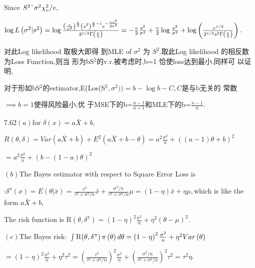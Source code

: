 \documentclass{article}
\begin{document}
Since $S^{2}\symbol{126}\sigma ^{2}\chi _{v}^{2}/v,$

$\log L\left( \sigma ^{2}|s^{2}\right) =\log \frac{\left( \frac{v}{\sigma
^{2}}\right) ^{\frac{v}{2}}\left( s^{2}\right) ^{\frac{v}{2}-1}e^{-\frac{%
vs^{2}}{2\sigma ^{2}}}}{2^{v/2}\Gamma \left( \frac{v}{2}\right) }=-\frac{v}{2%
}\frac{s^{2}}{\sigma ^{2}}+\frac{v}{2}\log \frac{s^{2}}{\sigma ^{2}}+\log
\left( \frac{v^{v/2}}{2^{v/2}s^{2}\Gamma \left( \frac{v}{2}\right) }\right)
. $

对此Log likelihood 取极大即得%
到MLE of $\sigma ^{2}$ 为 $S^{2}.$取此Log likelihood%
的相反数为Loss Function,则当%
形为bS$^{2}$的v.r.被考虑时,b=1%
恰使loss达到最小.同样可%
以证明,

对于形如bS$^{2}$的estimator,E(Los(S$%
^{2},\sigma ^{2}))=b-\log b-C,C$是与b无关的%
常数

$\implies b=1$使得风险最小,优%
于MSE下的b=$\frac{n-1}{n+1}$和MLE下的b=$%
\frac{n-1}{n}.$

7.62$\left( a\right) $for $\delta \left( x\right) =a\bar{X}+b,$

$R\left( \theta ,\delta \right) =Var\left( a\bar{X}+b\right) +E^{2}\left( a%
\bar{X}+b-\theta \right) =a^{2}\frac{\sigma ^{2}}{n}+\left( \left(
a-1\right) \theta +b\right) ^{2}$

$=a^{2}\frac{\sigma ^{2}}{n}+\left( b-\left( 1-a\right) \theta \right) ^{2}$

$\left( b\right) $The Bayes estimator with respect to Square Error Loss is

:$\delta ^{\pi }\left( x\right) =E\left( \theta |\bar{x}\right) =\frac{\tau
^{2}}{\tau ^{2}+\sigma ^{2}/n}\bar{x}+\frac{\sigma ^{2}/n}{\tau ^{2}+\sigma
^{2}/n}\mu =\left( 1-\eta \right) \bar{x}+\eta \mu ,$which is like the form $%
a\bar{X}+b,$

The risk function is R$\left( \theta ,\delta ^{\pi }\right) =\left( 1-\eta
\right) ^{2}\frac{\sigma ^{2}}{n}+\eta ^{2}\left( \theta -\mu \right) ^{2}.$

$\left( c\right) $The Bayes risk: $\int $R$\left( \theta ,\delta ^{\pi
}\right) \pi \left( \theta \right) d\theta =\left( 1-\eta \right) ^{2}\frac{%
\sigma ^{2}}{n}+\eta ^{2}Var\left( \theta \right) $

$=\left( 1-\eta \right) ^{2}\frac{\sigma ^{2}}{n}+\eta ^{2}\tau ^{2}=\left( 
\frac{\tau ^{2}}{\tau ^{2}+\sigma ^{2}/n}\right) ^{2}\frac{\sigma ^{2}}{n}%
+\left( \frac{\sigma ^{2}/n}{\tau ^{2}+\sigma ^{2}/n}\right) ^{2}\tau
^{2}=\tau ^{2}\eta .$
\end{document}
